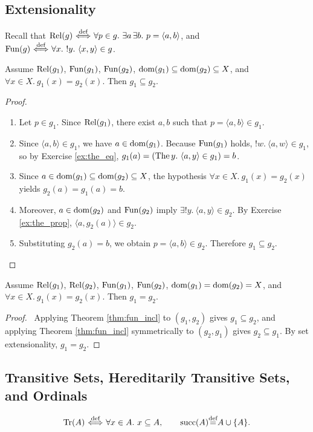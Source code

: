 \documentclass[10pt,a4paper]{article}
\renewcommand{\myprf}{\begin{proof}}
\renewcommand{\myqed}{\end{proof}}
\begin{document}
\subsection{Extensionality}\label{sec:extensionality}
Recall that ${\textrm{Rel}}(g) {\stackrel{{\textrm{def}}}{\ \Longleftrightarrow\ }} \forall p \in g.\ \exists a\, \exists b.\ p = \langle a,b\rangle$, and ${\textrm{Fun}}(g) {\stackrel{{\textrm{def}}}{\ \Longleftrightarrow\ }} \forall x.\ !y.\ \langle x,y\rangle \in g$.

\begin{theorem}\label{thm:fun_incl}
Assume ${\textrm{Rel}}(g_1)$, ${\textrm{Fun}}(g_1)$, ${\textrm{Fun}}(g_2)$, ${\textrm{dom}}(g_1)\subseteq{\textrm{dom}}(g_2)\subseteq X$, and $\forall x\in X.\ g_1(x)=g_2(x)$. Then $g_1\subseteq g_2$.
\end{theorem}
\myprf
\begin{enumerate}
\item Let $p \in g_1$. Since ${\textrm{Rel}}(g_1)$, there exist $a, b$ such that $p = \langle a, b\rangle \in g_1$.
\item Since $\langle a, b\rangle \in g_1$, we have $a \in {\textrm{dom}}(g_1)$. Because ${\textrm{Fun}}(g_1)$ holds, $!w.\ \langle a,w\rangle \in g_1$, so by Exercise \ref{ex:the_eq}, $g_1(a) = ({\textrm{The\,}} y.\ \langle a,y\rangle \in g_1) = b$.
\item Since $a \in {\textrm{dom}}(g_1) \subseteq {\textrm{dom}}(g_2) \subseteq X$, the hypothesis $\forall x \in X.\ g_1(x) = g_2(x)$ yields $g_2(a) = g_1(a) = b$.
\item Moreover, $a \in {\textrm{dom}}(g_2)$ and ${\textrm{Fun}}(g_2)$ imply $\exists !y.\ \langle a,y\rangle \in g_2$. By Exercise \ref{ex:the_prop}, $\langle a, g_2(a)\rangle \in g_2$.
\item Substituting $g_2(a) = b$, we obtain $p = \langle a, b\rangle \in g_2$. Therefore $g_1 \subseteq g_2$.
\end{enumerate}
\myqed

\begin{theorem}\label{thm:fun_ext}
Assume ${\textrm{Rel}}(g_1)$, ${\textrm{Rel}}(g_2)$, ${\textrm{Fun}}(g_1)$, ${\textrm{Fun}}(g_2)$, ${\textrm{dom}}(g_1) = {\textrm{dom}}(g_2) = X$, and $\forall x\in X.\ g_1(x)=g_2(x)$. Then $g_1 = g_2$.
\end{theorem}
\myprf\ Applying Theorem \ref{thm:fun_incl} to $(g_1, g_2)$ gives $g_1 \subseteq g_2$, and applying Theorem \ref{thm:fun_incl} symmetrically to $(g_2, g_1)$ gives $g_2 \subseteq g_1$. By set extensionality, $g_1 = g_2$. \myqed
\subsection{Transitive Sets, Hereditarily Transitive Sets, and Ordinals}\label{sec:ordinals}
\begin{definition}
$$\Tr(A) \propdef \forall x\in A.\ x\subseteq A, \qquad \mysucc(A) \eqdef A \cup \{A\}.$$
\end{definition}
\end{document}
